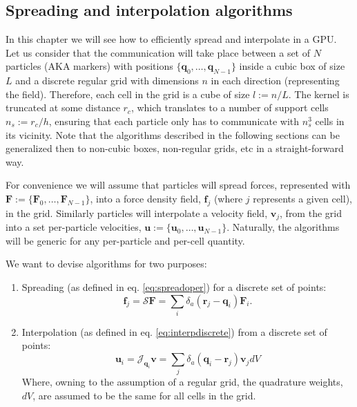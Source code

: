 \documentclass[ twoside,openright,titlepage,numbers=noenddot,%
headinclude,footinclude,cleardoublepage=empty,abstract=on,
BCOR=5mm,paper=a4,fontsize=11pt, dvipsnames
]{scrreprt}
\renewcommand{\vec}[1]{\bm{#1}}
\newcommand{\oper}[1]{\mathcal{#1}}
\newcommand{\gpu}{\gls{GPU}\xspace}
\newcommand{\ppos}{q}
\newcommand{\pvel}{u}
\newcommand{\fpos}{r}
\newcommand{\fvel}{v}
\begin{document}
\subsection{Spreading and interpolation algorithms}
In this chapter we will see how to efficiently spread and interpolate in a \gpu.
Let us consider that the communication will take place between a set of $N$ particles (AKA markers) with positions $\{\vec{\ppos}_0,\dots,\vec{\ppos}_{N-1}\}$ inside a cubic box of size $L$ and a discrete regular grid with dimensions $n$ in each direction (representing the field). Therefore, each cell in the grid is a cube of size $l := n/L$. The kernel is truncated at some distance $r_c$, which translates to a number of support cells $n_s:=r_c/h$, ensuring that each particle only has to communicate with $n_s^3$ cells in its vicinity. Note that the algorithms described in the following sections can be generalized then to non-cubic boxes, non-regular grids, etc in a straight-forward way.

For convenience we will assume that particles will spread forces, represented with $\vec{F}:=\{\vec{F}_0,\dots,\vec{F}_{N-1}\}$, into a force density field, $\vec{f}_j$ (where $j$ represents a given cell), in the grid. Similarly particles will interpolate a velocity field, $\vec{\fvel}_j$, from the grid into a set per-particle velocities, $\vec{\pvel}:=\{\vec{\pvel}_0,\dots,\vec{\pvel}_{N-1}\}$. Naturally, the algorithms will be generic for any per-particle and per-cell quantity.

We want to devise algorithms for two purposes:
\begin{enumerate}
\item Spreading (as defined in eq. \eqref{eq:spreadoper}) for a discrete set of points:
  \begin{equation}
    \vec{f}_j = \oper{S}\vec{F} = \sum_i \delta_a(\vec{\fpos}_j-\vec{\ppos}_i) \vec{F}_i.
  \end{equation}
\item Interpolation (as defined in eq. \eqref{eq:interpdiscrete}) from a discrete set of points:
  \begin{equation}
    \label{eq:interpdiscrete}
    \vec{u}_i = \oper{J}_{\vec{\ppos}_i}\vec{\fvel} = \sum_j{\delta_a(\vec{\ppos}_i - \vec{\fpos}_j)\vec{\fvel}_jdV}
  \end{equation}
  Where, owning to the assumption of a regular grid, the quadrature weights, $dV$, are assumed to be the same for all cells in the grid.
\end{enumerate}
\end{document}
